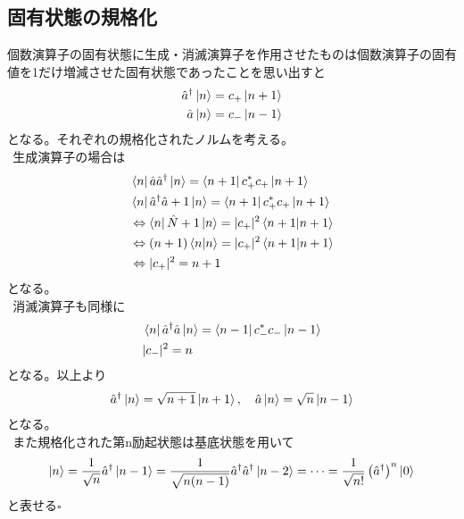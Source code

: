 \documentclass{jsarticle}  %
\numberwithin{equation}{section} %
\numberwithin{figure}{section}
\begin{document}
\subsection{固有状態の規格化}
    個数演算子の固有状態に生成・消滅演算子を作用させたものは個数演算子の固有値を1だけ増減させた固有状態であったことを思い出すと
    \begin{align}
        \hat{a}^\dagger \ket{n} &= c_+ \ket{n+1} \notag \\
        \hat{a}\ket{n} &= c_- \ket{n-1}
    \end{align}
    となる。それぞれの規格化されたノルムを考える。\\
    $\ \ $生成演算子の場合は
    \begin{align}
        &\bra{n}\hat{a}\hat{a}^\dagger \ket{n} = \bra{n+1} c_+^* c_+ \ket{n+1} \notag \\
        &\bra{n}\hat{a}^\dagger \hat{a}+1 \ket{n} = \bra{n+1} c_+^* c_+ \ket{n+1} \notag \\
        &\Leftrightarrow \bra{n}\hat{N} + 1\ket{n} = |c_+|^2 \braket{n+1|n+1} \notag \\
        &\Leftrightarrow (n+1) \braket{n|n} = |c_+|^2 \braket{n+1|n+1} \notag \\
        &\Leftrightarrow |c_+|^2 = n+1
    \end{align}
    となる。\\
    $\ \ $消滅演算子も同様に
    \begin{align}
        &\bra{n}\hat{a}^\dagger \hat{a} \ket{n} = \bra{n-1} c_-^* c_- \ket{n-1}  \notag \\
        &|c_-|^2 = n
    \end{align}
    となる。以上より
    \begin{align}
        \hat{a}^\dagger \ket{n} = \sqrt{n+1}\ket{n+1},\quad \hat{a}\ket{n} = \sqrt{n}\ket{n-1}
    \end{align}
    となる。\\
    $\ \ $また規格化された第n励起状態は基底状態を用いて
    \begin{align}
        \ket{n} = \frac{1}{\sqrt{n}} \hat{a}^\dagger \ket{n-1} = \frac{1}{\sqrt{n(n-1)}}\hat{a}^\dagger \hat{a}^\dagger \ket{n-2} = \cdots = \frac{1}{\sqrt{n!}}\left( \hat{a}^\dagger \right)^n \ket{0}
    \end{align}
    と表せる$\square$
\end{document}
